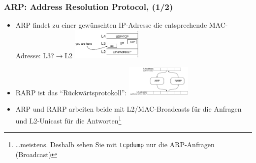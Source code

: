 \documentclass{beamer}
\begin{document}
\begin{frame}
\frametitle{ARP: Address Resolution Protocol, (1/2)}
\begin{itemize}
  \item{ARP findet zu einer gew\"unschten IP-Adresse die entsprechende MAC-Adresse: L3?$\rightarrow$L2 \includegraphics[height=1.5cm]{arp-layer}}


  \item{RARP ist das ``R\"uckw\"artsprotokoll'': \includegraphics[height=1.5cm]{arp-opschema}}
  \item{ARP und RARP arbeiten beide mit L2/MAC-Broadcasts f\"ur die Anfragen und L2-Unicast f\"ur die Antworten\footnote{\ldots meistens. Deshalb sehen Sie mit \texttt{tcpdump} nur die ARP-Anfragen (Broadcast)}}
\end{itemize}
\begin{tiny}

\end{tiny}
\end{frame}
\end{document}
